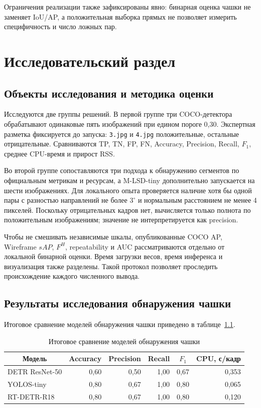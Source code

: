 \documentclass[a4paper,12pt]{extreport}
\newcommand{\code}[1]{\nolinkurl{#1}}
\begin{document}
Ограничения реализации также зафиксированы явно: бинарная оценка чашки не заменяет IoU/AP, а положительная выборка прямых не позволяет измерить специфичность и число ложных пар.

\chapter{Исследовательский раздел}

\section{Объекты исследования и методика оценки}

Исследуются две группы решений. В первой группе три COCO-детектора обрабатывают одинаковые пять изображений при едином пороге 0,30. Экспертная разметка фиксируется до запуска: \code{3.jpg} и \code{4.jpg} положительные, остальные отрицательные. Сравниваются TP, TN, FP, FN, Accuracy, Precision, Recall, $F_1$, среднее CPU-время и прирост RSS.

Во второй группе сопоставляются три подхода к обнаружению сегментов по официальным метрикам и ресурсам, а M-LSD-tiny дополнительно запускается на шести изображениях. Для локального опыта проверяется наличие хотя бы одной пары с разностью направлений не более $3^\circ$ и нормальным расстоянием не менее 4 пикселей. Поскольку отрицательных кадров нет, вычисляется только полнота по положительным изображениям; значение не интерпретируется как precision.

Чтобы не смешивать независимые шкалы, опубликованные COCO AP, Wireframe $sAP$, $F^H$, repeatability и AUC рассматриваются отдельно от локальной бинарной оценки. Время загрузки весов, время инференса и визуализация также разделены. Такой протокол позволяет проследить происхождение каждого численного вывода.

\section{Результаты исследования обнаружения чашки}

Итоговое сравнение моделей обнаружения чашки приведено в таблице~\ref{tab:cup-final}.

\begin{table}[H]
\centering\small
\caption{Итоговое сравнение моделей обнаружения чашки}
\label{tab:cup-final}
\begin{tabular}{|l|r|r|r|r|r|}
\hline
\multicolumn{1}{|c|}{Модель} & \multicolumn{1}{c|}{Accuracy} & \multicolumn{1}{c|}{Precision} & \multicolumn{1}{c|}{Recall} & \multicolumn{1}{c|}{$F_1$} & \multicolumn{1}{c|}{CPU, с/кадр} \\
\hline
DETR ResNet-50 & 0,60 & 0,50 & 1,00 & 0,67 & 0,353\\ \hline
YOLOS-tiny & 0,80 & 0,67 & 1,00 & 0,80 & 0,065\\ \hline
RT-DETR-R18 & 0,80 & 0,67 & 1,00 & 0,80 & 0,120\\
\hline
\end{tabular}
\end{table}
\end{document}
